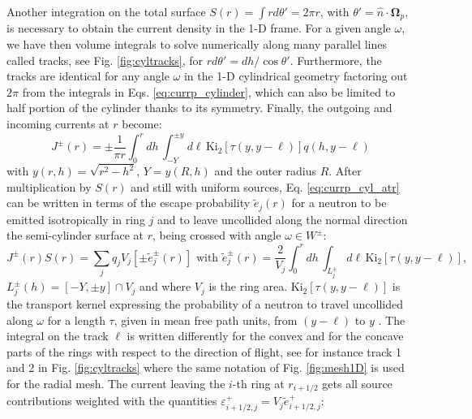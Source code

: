 \documentclass{ictt26}
\begin{document}
Another integration on the total surface $S(r) = \int{r d\theta'} = 2\pi r$, with $\theta' = \hat{n}\cdot \mathbf{\Omega}_p$, is necessary to obtain the current density in the 1-D frame. For a given angle $\omega$, we have then volume integrals to solve numerically along many parallel lines called tracks, see Fig. \ref{fig:cyltracks}, for $r d\theta' = dh/\cos \theta'$. Furthermore, the tracks are identical for any angle $\omega$ in the 1-D cylindrical geometry factoring out $2\pi$ from the integrals in Eqs. \ref{eq:currp_cylinder}, which can also be limited to half portion of the cylinder thanks to its symmetry. Finally, the outgoing and incoming currents at $r$ become:
\begin{equation}
J^\pm(r) = \pm \frac{1}{\pi r} \int_0^r { dh\,
    \int_{-Y}^{\pm y}{d \ell \,
      \text{Ki}_2\left[\tau( y, y - \ell )\right] q(h, y - \ell)}}
\label{eq:currp_cyl_atr}
\end{equation}
with $y(r,h) =\sqrt{r^2 - h^2}$, $Y = y(R,h)$ and the outer radius $R$. After multiplication by $S(r)$ and still with uniform sources, Eq. \ref{eq:currp_cyl_atr} can be written in terms of the escape probability $\tilde{e}_{j}(r)$ for a neutron to be emitted isotropically in ring $j$ and to leave uncollided along the normal direction the semi-cylinder surface at $r$, being crossed with angle $\omega \in W^\pm$:
\begin{equation}
J^\pm(r)S(r) = \sum_j q_j V_j \left[ \pm \tilde{e}^\pm_j(r) \right] \mbox{ with }
\tilde{e}^\pm_j(r) = \frac{2}{V_j} \int_0^r { dh\,
  \int_{L^\pm_j}{d \ell \, \text{Ki}_2\left[\tau( y, y - \ell )\right]}},
\label{eq:esc_prob_cyl}
\end{equation}
$L^\pm_j(h) = [-Y,\pm y] \cap V_j$ and where $V_j$ is the ring area. $\text{Ki}_2\left[\tau( y, y - \ell )\right]$ is the transport kernel expressing the probability of a neutron to travel uncollided along $\omega$ for a length $\tau$, given in mean free path units, from $(y - \ell)$ to $y$ \cite{stamm1983methods}. The integral on the track $\ell$ is written differently for the convex and for the concave parts of the rings with respect to the direction of flight, see for instance track 1 and 2 in Fig. \ref{fig:cyltracks} where the same notation of Fig. \ref{fig:mesh1D} is used for the radial mesh. The current leaving the $i$-th ring at $r_{i+1/2}$ gets all source contributions weighted with the quantities $\varepsilon^+_{i+1/2,j} = V_j \tilde{e}^+_{i+1/2,j}$:
%
\newlength{\plussign}
\end{document}
